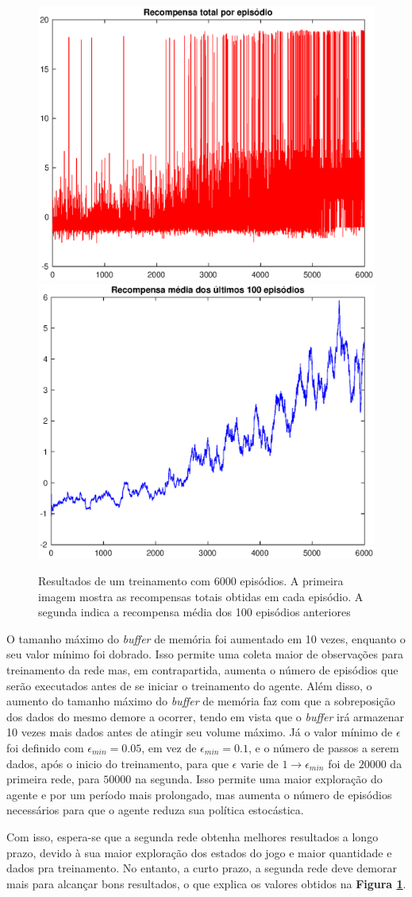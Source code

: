 \begin{figure}[h]
  \centering
  \includegraphics[width=.55 \textwidth]{conteudo/imgs/resultados/historico_recompensa_v2.eps}
  \includegraphics[width=.55 \textwidth]{conteudo/imgs/resultados/resompensa_media_100_epis_v2.eps}
  \caption[Resultados de Performance]{Resultados de um treinamento com 6000 episódios. A primeira imagem mostra as recompensas totais obtidas em cada episódio. A segunda indica a recompensa média dos 100 episódios anteriores}
  \label{fig:resultados_v2}
\end{figure}

O tamanho máximo do \textit{buffer} de memória foi aumentado em 10 vezes, enquanto o seu valor mínimo foi dobrado. Isso permite uma coleta maior de observações para treinamento da rede mas, em contrapartida, aumenta o número de episódios que serão executados antes de se iniciar o treinamento do agente. Além disso, o aumento do tamanho máximo do \textit{buffer} de memória faz com que a sobreposição dos dados do mesmo demore a ocorrer, tendo em vista que o \textit{buffer} irá armazenar 10 vezes mais dados antes de atingir seu volume máximo. Já o valor mínimo de $\epsilon$ foi definido com $\epsilon_{min}=0.05$, em vez de $\epsilon_{min}=0.1$, e o número de passos a serem dados, após o inicio do treinamento, para que $\epsilon$ varie de $1\rightarrow\epsilon_{min}$ foi de $20000$ da primeira rede, para $50000$ na segunda. Isso permite uma maior exploração do agente e por um período mais prolongado, mas aumenta o número de episódios necessários para que o agente reduza sua política estocástica.

Com isso, espera-se que a segunda rede obtenha melhores resultados a longo prazo, devido à sua maior exploração dos estados do jogo e maior quantidade e dados pra treinamento. No entanto, a curto prazo, a segunda rede deve demorar mais para alcançar bons resultados, o que explica os valores obtidos na \textbf{Figura \ref{fig:resultados_v2}}.
